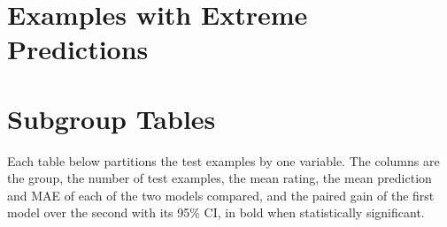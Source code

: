 \documentclass[11pt]{article}
\begin{document}
\begin{table}[htbp]\centering\footnotesize
{}
\caption{Hand-crafted features: the inputs of  in addition
to the scalar context features, and of a network whose configuration includes
them.}
\label{tab:hand}
\end{table}

\iflook
\section{Examples with Extreme Predictions}



\section{Subgroup Tables}

Each table below partitions the test examples by one variable. The columns
are the group, the number of test examples, the mean rating, the mean
prediction and MAE of each of the two models compared, and the paired gain of
the first model over the second with its 95\% CI, in bold when statistically
significant.

\fi
\end{document}
